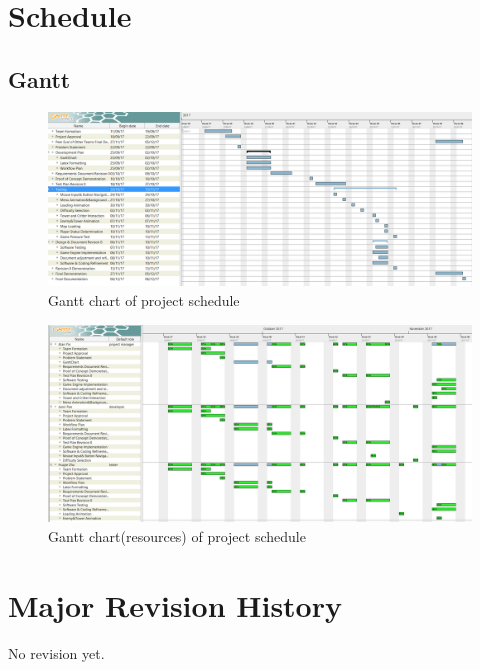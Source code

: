 \documentclass[12,english]{article}
\begin{document}
\clearpage

\section{Schedule}

\subsection{Gantt}
    \begin{figure}[h]
    \centering
	\includegraphics[width=1.1\textwidth]{gantt.png}
    \caption{Gantt chart of project schedule}
	\end{figure}

	\begin{figure}[h]
	\centering
	\includegraphics[width=1\textwidth]{resource.png}
	\caption{Gantt chart(resources) of project schedule}
	\end{figure}
	



\section{Major Revision History}
No revision yet.
\end{document}
